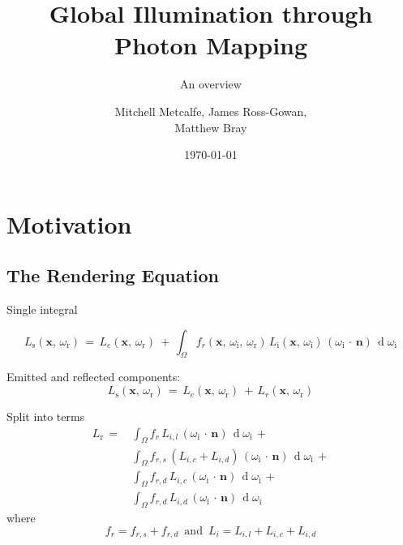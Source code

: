 \documentclass{beamer}
\title[COMP3320 Background Presentation]{Global Illumination through Photon Mapping}
\subtitle{An overview}
\author{Mitchell Metcalfe, James Ross-Gowan,\\ Matthew Bray}
\institute{University of Newcastle}
\date{\today}
\begin{document}
  \maketitle
  
  \section{Motivation}

    \subsection{The Rendering Equation}

      \begin{frame}{Single integral}

        \[
          L_{\text{s}}(\mathbf x,\, \omega_{\text{r}}) \,=\,%
            L_e(\mathbf x,\, \omega_{\text{r}}) \ +\, %
            \int_\Omega %
              f_r(\mathbf x,\, \omega_{\text{i}},\, \omega_{\text{r}})\, %
                L_{\text{i}}(\mathbf x,\, \omega_{\text{i}})\, %
              (\omega_{\text{i}}\,\cdot\,\mathbf n)\,
            \operatorname d \omega_{\text{i}}
        \]

        \pause
        Emitted and reflected components:
        \[
          L_{\text{s}}(\mathbf x,\, \omega_{\text{r}}) \,=\,%
            L_e(\mathbf x,\, \omega_{\text{r}}) \ +\, %
            L_r(\mathbf x,\, \omega_{\text{r}})
        \]
      \end{frame}

      \begin{frame}{Split into terms}
        \begin{equation*}
        \begin{split}
          L_{\text{r}} \,=\,%
            &\int_\Omega %
              f_r\, %
                L_{i,l}\, %
              (\omega_{\text{i}}\,\cdot\,\mathbf n)\,
            \operatorname d \omega_{\text{i}}%
            \, +\\%
            &\int_\Omega %
              f_{r, s}\, %
                (L_{i,c} + L_{i,d})\, %
              (\omega_{\text{i}}\,\cdot\,\mathbf n)\,
            \operatorname d \omega_{\text{i}}
            \, +\\%
            &\int_\Omega %
              f_{r, d}\, %
                L_{i,c}\, %
              (\omega_{\text{i}}\,\cdot\,\mathbf n)\,
            \operatorname d \omega_{\text{i}}
            \, +\\%
            &\int_\Omega %
              f_{r, d}\, %
                L_{i,d}\, %
              (\omega_{\text{i}}\,\cdot\,\mathbf n)\,
            \operatorname d \omega_{\text{i}}
        \, \end{split}
        \end{equation*}
        where
        \[
          f_r = f_{r, s} + f_{r, d}%
          \, \text{ and } \, %
          L_i = L_{i,l} + L_{i,c} + L_{i,d}
        \]
      \end{frame}
\end{document}
